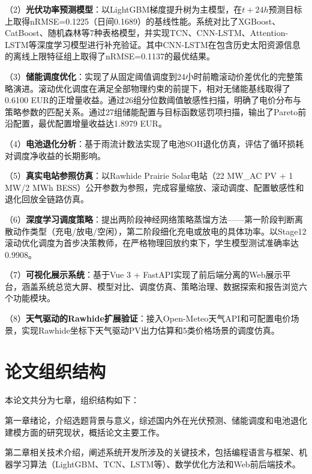\documentclass[12pt,a4paper]{ctexbook}
\begin{document}
（2）\textbf{光伏功率预测模型}：以LightGBM梯度提升树为主模型，在$t+24h$预测目标上取得nRMSE=0.1225（日间0.1689）的基线性能。系统对比了XGBoost、CatBoost、随机森林等7种表格模型，并实现TCN、CNN-LSTM、Attention-LSTM等深度学习模型进行补充验证。其中CNN-LSTM在包含历史太阳资源信息的离线上限特征组上取得了nRMSE=0.1137的最优结果。\cite{lightgbm-2017,xgboost-2016,catboost-2018,random-forest-2001,tcn-wan-2019,wang-cnn-lstm-2019,qu-attention-cnnlstm-2021}

（3）\textbf{储能调度优化}：实现了从固定阈值调度到24小时前瞻滚动价差优化的完整策略演进。滚动优化调度在满足全部物理约束的前提下，相对无储能基线取得了0.6100 EUR的正增量收益。通过26组分位数阈值敏感性扫描，明确了电价分布与策略参数的匹配关系。通过27组储能配置与目标函数惩罚项扫描，输出了Pareto前沿配置，最优配置增量收益达1.8979 EUR。\cite{bo-two-stage-rolling-2025,li-mpc-microgrid-2025}

（4）\textbf{电池退化分析}：基于雨流计数法实现了电池SOH退化仿真，评估了循环损耗对调度净收益的长期影响。\cite{battery-degradation-review-2021,rainflow-soc-2022}

（5）\textbf{真实电站参照仿真}：以Rawhide Prairie Solar电站（22 MW\_AC PV + 1 MW/2 MWh BESS）公开参数为参照，完成容量缩放、滚动调度、配置敏感性和退化回放全链路仿真。\cite{rawhide-nrel}

（6）\textbf{深度学习调度策略}：提出两阶段神经网络策略蒸馏方法——第一阶段判断离散动作类型（充电/放电/空闲），第二阶段细化充电或放电的具体功率。以Stage12滚动优化调度为首步决策教师，在严格物理回放约束下，学生模型测试准确率达0.9908。\cite{policy-distillation-2016}

（7）\textbf{可视化展示系统}：基于Vue 3 + FastAPI实现了前后端分离的Web展示平台，涵盖系统总览大屏、模型对比、调度仿真、策略治理、数据探索和报告浏览六个功能模块。\cite{vue3,fastapi}

（8）\textbf{天气驱动的Rawhide扩展验证}：接入Open-Meteo天气API和可配置电价场景，实现Rawhide坐标下天气驱动PV出力估算和5类价格场景的调度仿真。\cite{open-meteo-2023,rawhide-nrel}

\section{论文组织结构}

本论文共分为七章，组织结构如下：

第一章绪论，介绍选题背景与意义，综述国内外在光伏预测、储能调度和电池退化建模方面的研究现状，概括论文主要工作。

第二章相关技术介绍，阐述系统开发所涉及的关键技术，包括编程语言与框架、机器学习算法（LightGBM、TCN、LSTM等）、数学优化方法和Web前后端技术。
\end{document}
